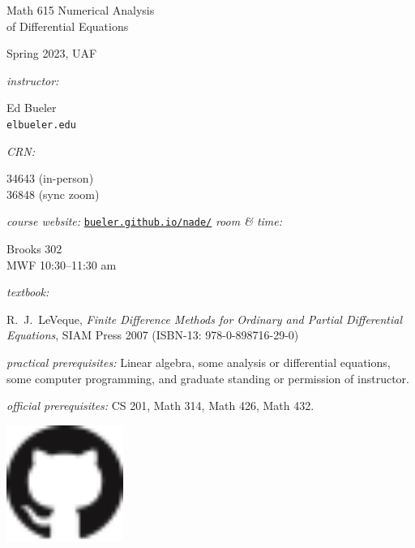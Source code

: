 \documentclass[12pt]{amsart}
\begin{document}
\begin{center}
\LARGE Math 615 Numerical Analysis \\ of Differential Equations

\large \medskip
Spring 2023, UAF
\end{center}

\thispagestyle{empty}
\bigskip\bigskip

\noindent \emph{instructor:} \begin{minipage}[t]{0.5\textwidth} Ed Bueler \\ \texttt{elbueler\@@alaska.edu} \end{minipage} \hfill \emph{CRN:}\, \begin{minipage}[t]{0.25\textwidth} 34643 (in-person) \\ 36848 (sync zoom) \end{minipage}

\medskip
\noindent \emph{course website:} \href{https://bueler.github.io/nade/}{\texttt{bueler.github.io/nade/}} \hfill \emph{room \& time:} \begin{minipage}[t]{0.25\textwidth} Brooks 302 \\ MWF 10:30--11:30 am \end{minipage}

\medskip
\noindent \emph{textbook:} \begin{minipage}[t]{0.6\textwidth} R.~J.~LeVeque, \emph{Finite Difference Methods for Ordinary and Partial Differential Equations}, SIAM Press 2007 {\footnotesize (ISBN-13: 978-0-898716-29-0)} \end{minipage}

\bigskip
\noindent \emph{practical prerequisites:} Linear algebra, some analysis or differential equations, some computer programming, and graduate standing or permission of instructor.

\noindent \emph{official prerequisites:} CS 201, Math 314, Math 426, Math 432.

\hfill \includegraphics[height=38mm]{../../images/GitHub-Mark-32px.png}

\vspace{5mm}
\end{document}
